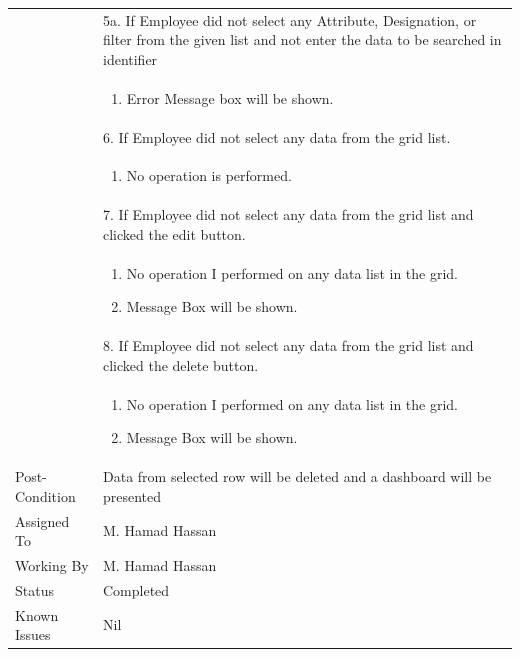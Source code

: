 \documentclass[12pt,a4paper]{article}
\begin{document}
\begin{longtable}{| p{3cm}|p{12cm}|}
& 5a. If Employee did not select any Attribute, Designation, or filter from the given list and not enter the data to be searched in identifier \\
& \begin{enumerate}
		\item Error Message box will be shown.
	\end{enumerate}
\\  
& 6. If Employee did not select any data from the grid list.  \\
& \begin{enumerate}
		\item No operation is performed.
	\end{enumerate}

\\
& 7. If Employee did not select any data from the grid list and clicked the edit button.\\
& \begin{enumerate}
		\item No operation I performed on any data list in the grid.
            \item Message Box will be shown.
	\end{enumerate}
\\
      & 8. If Employee did not select any data from the grid list and clicked the delete button.\\
 	&\begin{enumerate}
			\item No operation I performed on any data list in the grid.
            \item Message Box will be shown.
	\end{enumerate}
\\ \hline 


Post-Condition &  Data from selected row will be deleted and a dashboard will be presented \\ \hline
Assigned To &  M. Hamad Hassan
\\ \hline
Working By &    M. Hamad Hassan
\\ \hline
Status & 	Completed	
\\ \hline
Known Issues & Nil
\\\hline
\end{longtable}
\end{document}
